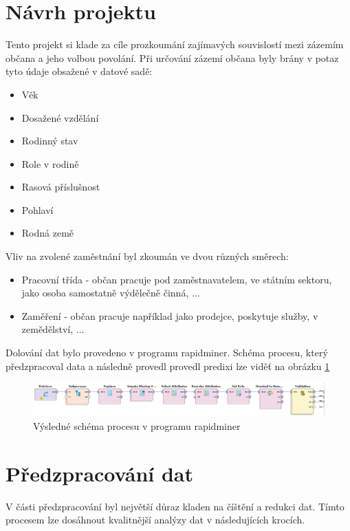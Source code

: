 \documentclass[11pt,a4paper,titlepage]{article}
\begin{document}
    \section{Návrh projektu\label{cile}}
    
    Tento projekt si klade za cíle prozkoumání zajímavých souvislostí mezi zázemím občana a jeho volbou povolání. Při určování zázemí občana byly brány v potaz tyto údaje obsažené v datové sadě:
    
    \begin{itemize}
    	\item Věk
		\item Dosažené vzdělání
		\item Rodinný stav
		\item Role v rodině
		\item Rasová příslušnost
		\item Pohlaví
		\item Rodná země
    \end{itemize}
    
    
	Vliv na zvolené zaměstnání byl zkoumán ve dvou různých směrech:
    \begin{itemize}
        \item Pracovní třída - občan pracuje pod zaměstnavatelem, ve státním sektoru, jako osoba samostatně výdělečně činná, ...
        \item Zaměření - občan pracuje například jako prodejce, poskytuje služby, v zemědělství, ...
    \end{itemize}
    
    Dolování dat bylo provedeno v programu rapidminer. Schéma procesu, který předzpracoval data a následně provedl provedl predixi lze viděť na obrázku \ref{proces}
    \begin{figure}[H]
        \label{proces}
        \centering
        \includegraphics[width=1\textwidth]{./img/process.png}
        \caption{Výsledné schéma procesu v programu rapidminer}
    \end{figure}

    \section{Předzpracování dat}
        V části předzpracování byl největší důraz kladen na číštění a redukci dat. Tímto procesem lze dosáhnout kvalitnější analýzy dat v následujících krocích. 
        
\end{document}

